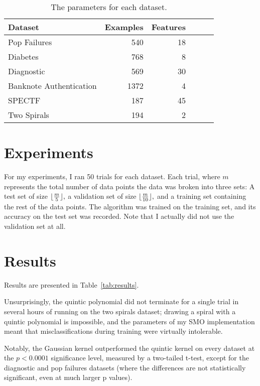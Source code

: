\documentclass{journal}
\DeclarePairedDelimiter\floor{\lfloor}{\rfloor}
\begin{document}
\begin{table}[t]
\centering{}
\caption{The parameters for each dataset.}\label{tab:datasets}
\begin{tabular}{lrrrrr}
    Dataset & Examples & Features \\ \toprule
    Pop Failures & 540 & 18 \\
    Diabetes & 768 & 8 \\
    Diagnostic & 569 & 30 \\
    Banknote Authentication & 1372 & 4 \\
    SPECTF & 187 & 45 \\
    Two Spirals & 194 & 2
\end{tabular}
\end{table}

\section{Experiments}
For my experiments, I ran 50 trials for each dataset. Each trial, where $m$
represents the total number of data points the data was
broken into three sets: A test set of size $\floor{\frac{m}{5}},$ a validation
set of size $\floor{\frac{m}{10}},$ and a training set containing the rest of
the data points. The algorithm was trained on the training set, and its accuracy
on the test set was recorded.
Note that I actually did not use the validation set at all.

\section{Results}
Results are presented in Table~\ref{tab:results}.

Unsurprisingly, the quintic
polynomial did not terminate for a single trial in several hours of running on
the two spirals dataset; drawing a spiral with a quintic polynomial is
impossible, and the parameters of my SMO implementation meant that
misclassifications during training were virtually intolerable.

Notably, the Gaussian kernel
outperformed the quintic kernel on every dataset at the $p < 0.0001$
significance level, measured by a two-tailed t-test, except for the diagnostic
and pop failures datasets
(where the differences are not statistically significant, even at much larger
p values).
\end{document}
